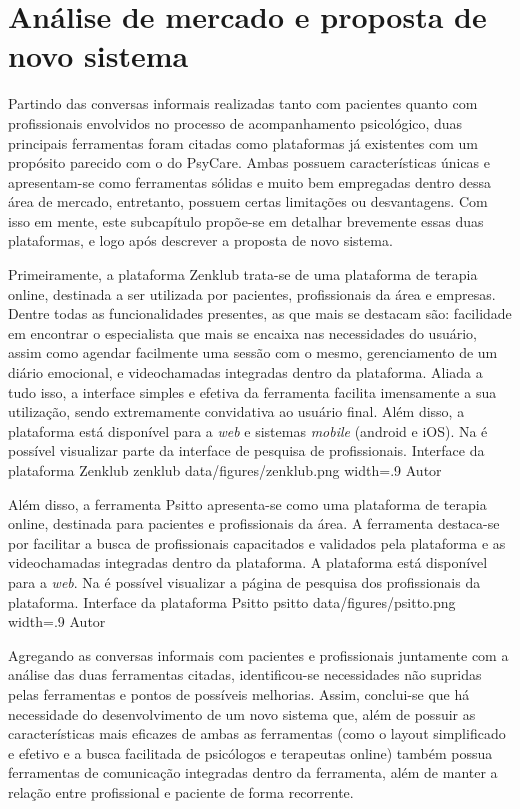 \section{Análise de mercado e proposta de novo sistema}
\label{sec:analise}

Partindo das conversas informais realizadas tanto com pacientes quanto com profissionais envolvidos no processo de acompanhamento psicológico, duas principais ferramentas foram citadas como plataformas já existentes com um propósito parecido com o do PsyCare. Ambas possuem características únicas e apresentam-se como ferramentas sólidas e muito bem empregadas dentro dessa área de mercado, entretanto, possuem certas limitações ou desvantagens. Com isso em mente, este subcapítulo propõe-se em detalhar brevemente essas duas plataformas, e logo após descrever a proposta de novo sistema.

Primeiramente, a plataforma Zenklub trata-se de uma plataforma de terapia online, destinada a ser utilizada por pacientes, profissionais da área e empresas. Dentre todas as funcionalidades presentes, as que mais se destacam são: facilidade em encontrar o especialista que mais se encaixa nas necessidades do usuário, assim como agendar facilmente uma sessão com o mesmo, gerenciamento de um diário emocional, e videochamadas integradas dentro da plataforma. Aliada a tudo isso, a interface simples e efetiva da ferramenta facilita imensamente a sua utilização, sendo extremamente convidativa ao usuário final. Além disso, a plataforma está disponível para a \textit{web} e sistemas \textit{mobile} (android e iOS). Na  é possível visualizar parte da interface de pesquisa de profissionais.
\image
    {Interface da plataforma Zenklub}
    {zenklub}
    {data/figures/zenklub.png}
    {width=.9\textwidth}
    {Autor}

Além disso, a ferramenta Psitto apresenta-se como uma plataforma de terapia online, destinada para pacientes e profissionais da área. A ferramenta destaca-se por facilitar a busca de profissionais capacitados e validados pela plataforma e as videochamadas integradas dentro da plataforma. A plataforma está disponível para a \textit{web}. Na  é possível visualizar a página de pesquisa dos profissionais da plataforma.
\image
    {Interface da plataforma Psitto}
    {psitto}
    {data/figures/psitto.png}
    {width=.9\textwidth}
    {Autor}

Agregando as conversas informais com pacientes e profissionais juntamente com a análise das duas ferramentas citadas, identificou-se necessidades não supridas pelas ferramentas e pontos de possíveis melhorias. Assim, conclui-se que há necessidade do desenvolvimento de um novo sistema que, além de possuir as características mais eficazes de ambas as ferramentas (como o layout simplificado e efetivo e a busca facilitada de psicólogos e terapeutas online) também possua ferramentas de comunicação integradas dentro da ferramenta, além de manter a relação entre profissional e paciente de forma recorrente. 
